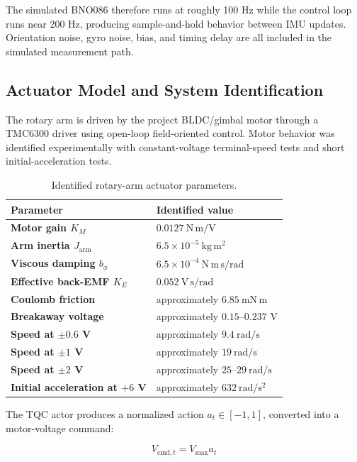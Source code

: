 \documentclass[9pt]{extarticle}
\begin{document}
The simulated BNO086 therefore runs at roughly 100 Hz while the control
loop runs near 200 Hz, producing sample-and-hold behavior between IMU
updates. Orientation noise, gyro noise, bias, and timing delay are all
included in the simulated measurement path.


\subsection{Actuator Model and System Identification}

The rotary arm is driven by the project BLDC/gimbal motor through a
TMC6300 driver using open-loop field-oriented control. Motor behavior was
identified experimentally with constant-voltage terminal-speed tests and
short initial-acceleration tests.

\begin{table}[h]
\centering
\small
\caption{Identified rotary-arm actuator parameters.}
\begin{tabularx}{0.78\linewidth}{>{\bfseries}X X}
\toprule
Parameter & Identified value \\
\midrule
Motor gain $K_M$ & $0.0127~\mathrm{N\,m/V}$ \\
Arm inertia $J_{\mathrm{arm}}$ & $6.5\times10^{-5}~\mathrm{kg\,m^2}$ \\
Viscous damping $b_\phi$ & $6.5\times10^{-4}~\mathrm{N\,m\,s/rad}$ \\
Effective back-EMF $K_E$ & $0.052~\mathrm{V\,s/rad}$ \\
Coulomb friction & approximately $6.85~\mathrm{mN\,m}$ \\
Breakaway voltage & approximately $0.15$--$0.237$ V \\
Speed at $\pm0.6$ V & approximately $9.4~\mathrm{rad/s}$ \\
Speed at $\pm1$ V & approximately $19~\mathrm{rad/s}$ \\
Speed at $\pm2$ V & approximately $25$--$29~\mathrm{rad/s}$ \\
Initial acceleration at $+6$ V & approximately $632~\mathrm{rad/s^2}$ \\
\bottomrule
\end{tabularx}
\end{table}

The TQC actor produces a normalized action $a_t\in[-1,1]$, converted into a
motor-voltage command:

\begin{equation}
\boxed{
V_{\mathrm{cmd},t}=V_{\max}a_t
}
\label{eq:voltage_command}
\end{equation}
\end{document}

